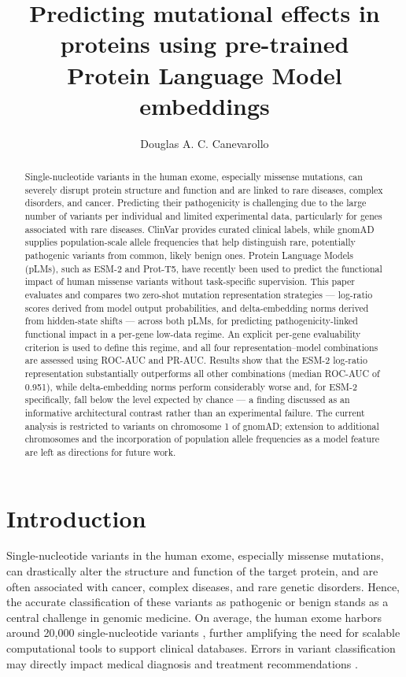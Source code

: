 \documentclass[12pt]{article}
\title{Predicting mutational effects in proteins using pre-trained\\Protein Language Model embeddings}
\author{Douglas A. C. Canevarollo\inst{1}}
\begin{document}
\maketitle

\begin{abstract}
Single-nucleotide variants in the human exome, especially missense mutations, can severely disrupt protein structure and function and are linked to rare diseases, complex disorders, and cancer. Predicting their pathogenicity is challenging due to the large number of variants per individual and limited experimental data, particularly for genes associated with rare diseases. ClinVar provides curated clinical labels, while gnomAD supplies population-scale allele frequencies that help distinguish rare, potentially pathogenic variants from common, likely benign ones. Protein Language Models (pLMs), such as ESM-2 and Prot-T5, have recently been used to predict the functional impact of human missense variants without task-specific supervision. This paper evaluates and compares two zero-shot mutation representation strategies --- log-ratio scores derived from model output probabilities, and delta-embedding norms derived from hidden-state shifts --- across both pLMs, for predicting pathogenicity-linked functional impact in a per-gene low-data regime. An explicit per-gene evaluability criterion is used to define this regime, and all four representation--model combinations are assessed using ROC-AUC and PR-AUC. Results show that the ESM-2 log-ratio representation substantially outperforms all other combinations (median ROC-AUC of 0.951), while delta-embedding norms perform considerably worse and, for ESM-2 specifically, fall below the level expected by chance --- a finding discussed as an informative architectural contrast rather than an experimental failure. The current analysis is restricted to variants on chromosome 1 of gnomAD; extension to additional chromosomes and the incorporation of population allele frequencies as a model feature are left as directions for future work.
\end{abstract}

\section{Introduction}

Single-nucleotide variants in the human exome, especially missense mutations, can drastically alter the structure and function of the target protein, and are often associated with cancer, complex diseases, and rare genetic disorders. Hence, the accurate classification of these variants as pathogenic or benign stands as a central challenge in genomic medicine. On average, the human exome harbors around 20,000 single-nucleotide variants \cite{alirezaie}, further amplifying the need for scalable computational tools to support clinical databases. Errors in variant classification may directly impact medical diagnosis and treatment recommendations \cite{sharo}.
\end{document}
